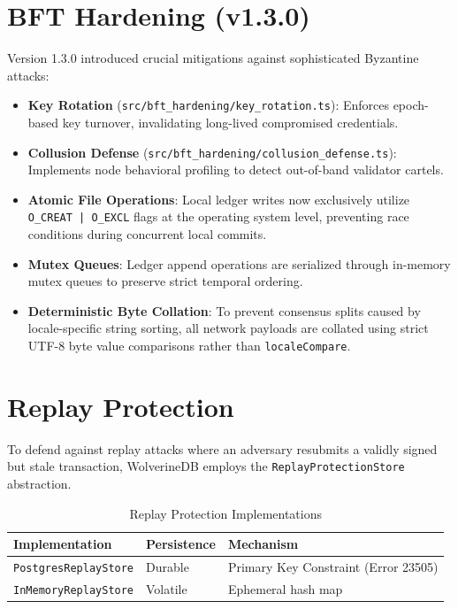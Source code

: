 \section{BFT Hardening (v1.3.0)}\label{sec:wdb-hardening}
Version 1.3.0 introduced crucial mitigations against sophisticated Byzantine attacks:
\begin{itemize}
    \item \textbf{Key Rotation} (\texttt{src/bft\_hardening/key\_rotation.ts}): Enforces epoch-based key turnover, invalidating long-lived compromised credentials.
    \item \textbf{Collusion Defense} (\texttt{src/bft\_hardening/collusion\_defense.ts}): Implements node behavioral profiling to detect out-of-band validator cartels.
    \item \textbf{Atomic File Operations}: Local ledger writes now exclusively utilize \texttt{O\_CREAT | O\_EXCL} flags at the operating system level, preventing race conditions during concurrent local commits.
    \item \textbf{Mutex Queues}: Ledger append operations are serialized through in-memory mutex queues to preserve strict temporal ordering.
    \item \textbf{Deterministic Byte Collation}: To prevent consensus splits caused by locale-specific string sorting, all network payloads are collated using strict UTF-8 byte value comparisons rather than \texttt{localeCompare}.
\end{itemize}

\section{Replay Protection}\label{sec:wdb-replay}
To defend against replay attacks where an adversary resubmits a validly signed but stale transaction, WolverineDB employs the \texttt{ReplayProtectionStore} abstraction. 

\begin{table}[htbp]
\centering
\caption{Replay Protection Implementations}
\label{tab:wdb-replay}
\begin{tabular}{@{}lll@{}}
\toprule
\textbf{Implementation} & \textbf{Persistence} & \textbf{Mechanism} \\ \midrule
\texttt{PostgresReplayStore} & Durable & Primary Key Constraint (Error 23505) \\
\texttt{InMemoryReplayStore} & Volatile & Ephemeral hash map \\ \bottomrule
\end{tabular}
\end{table}

